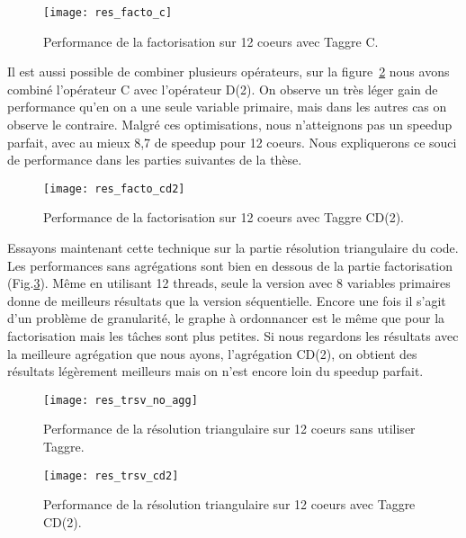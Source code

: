 \begin{figure}[t!]
  \centering
  \texttt{[image: res\_facto\_c]}
  \caption{Performance de la factorisation sur 12 coeurs avec Taggre C.}
  \label{fig:res_facto_c}
\end{figure}

Il est aussi possible de combiner plusieurs opérateurs, sur la figure~\ref{fig:res_facto_cd2} nous avons combiné l'opérateur C avec l'opérateur D(2).
%
On observe un très léger gain de performance qu'en on a une seule variable primaire, mais dans les autres cas on observe le contraire.
%
Malgré ces optimisations, nous n'atteignons pas un speedup parfait, avec au mieux 8,7 de speedup pour 12 coeurs.
%
Nous expliquerons ce souci de performance dans les parties suivantes de la thèse.

\begin{figure}[t!]
  \centering
  \texttt{[image: res\_facto\_cd2]}
  \caption{Performance de la factorisation sur 12 coeurs avec Taggre CD(2).}
  \label{fig:res_facto_cd2}
\end{figure}

Essayons maintenant cette technique sur la partie résolution triangulaire du code.
%
Les performances sans agrégations sont bien en dessous de la partie factorisation (Fig.\ref{fig:res_trsv_no_agg}).
%
Même en utilisant 12 threads, seule la version avec 8 variables primaires donne de meilleurs résultats que la version séquentielle.
%
Encore une fois il s'agit d'un problème de granularité, le graphe à ordonnancer est le même que pour la factorisation mais les tâches sont plus petites.
%
Si nous regardons les résultats avec la meilleure agrégation que nous ayons, l'agrégation CD(2), on obtient des résultats légèrement meilleurs mais on n'est encore loin du speedup parfait.

\begin{figure}[t!]
  \centering
  \texttt{[image: res\_trsv\_no\_agg]}
  \caption{Performance de la résolution triangulaire sur 12 coeurs sans utiliser Taggre.}
  \label{fig:res_trsv_no_agg}
\end{figure}


\begin{figure}[t!]
  \centering
  \texttt{[image: res\_trsv\_cd2]}
  \caption{Performance de la résolution triangulaire sur 12 coeurs avec Taggre CD(2).}
  \label{fig:res_trsv_cd2}
\end{figure}

